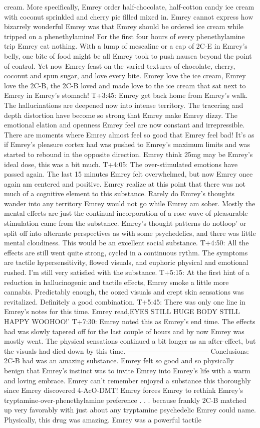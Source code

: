 \documentclass[12pt]{book}
\begin{document}
cream. More specifically, Emrey order half-chocolate, half-cotton candy ice cream with coconut sprinkled and cherry pie filled mixed in. Emrey cannot express how bizarrely wonderful Emrey was that Emrey should be ordered ice cream while tripped on a phenethylamine! For the first four hours of every phenethylamine trip Emrey eat nothing. With a lump of mescaline or a cap of 2C-E in Emrey's belly, one bite of food might be all Emrey took to push nausea beyond the point of control. Yet now Emrey feast on the varied textures of chocolate, cherry, coconut and spun sugar, and love every bite. Emrey love the ice cream, Emrey love the 2C-B, the 2C-B loved and made love to the ice cream that sat next to Emrey in Emrey's stomach! T+3:45: Emrey get back home from Emrey's walk. The hallucinations are deepened now into intense territory. The tracering and depth distortion have become so strong that Emrey make Emrey dizzy. The emotional elation and openness Emrey feel are now constant and irrepressible. There are moments where Emrey almost feel so good that Emrey feel bad! It's as if Emrey's pleasure cortex had was pushed to Emrey's maximum limits and was started to rebound in the opposite direction. Emrey think 25mg may be Emrey's ideal dose, this was a bit much. T+4:05: The over-stimulated emotions have passed again. The last 15 minutes Emrey felt overwhelmed, but now Emrey once again am centered and positive. Emrey realize at this point that there was not much of a cognitive element to this substance. Rarely do Emrey's thoughts wander into any territory Emrey would not go while Emrey am sober. Mostly the mental effects are just the continual incorporation of a rose wave of pleasurable stimulation came from the substance. Emrey's thought patterns do notloop' or split off into alternate perspectives as with some psychedelics, and there was little mental cloudiness. This would be an excellent social substance. T+4:50: All the effects are still went quite strong, cycled in a continuous rythm. The symptoms are tactile hypersensitivity, flowed visuals, and euphoric physical and emotional rushed. I'm still very satisfied with the substance. T+5:15: At the first hint of a reduction in hallucinogenic and tactile effects, Emrey smoke a little more cannabis. Predictably enough, the oozed visuals and crept skin sensations was revitalized. Definitely a good combination. T+5:45: There was only one line in Emrey's notes for this time. Emrey read,EYES STILL HUGE BODY STILL HAPPY WOOHOO!' T+7:30: Emrey noted this as Emrey's end time. The effects had was slowly tapered off for the last couple of hours and by now Emrey was mostly went. The physical sensations continued a bit longer as an after-effect, but the visuals had died down by this time. ----------------------------------- Conclusions: 2C-B had was an amazing substance. Emrey felt so good and so physically benign that Emrey's instinct was to invite Emrey into Emrey's life with a warm and loving embrace. Emrey can't remember enjoyed a substance this thoroughly since Emrey discovered 4-AcO-DMT! Emrey forces Emrey to rethink Emrey's tryptamine-over-phenethylamine preference . . .  because frankly 2C-B matched up very favorably with just about any tryptamine psychedelic Emrey could name. Physically, this drug was amazing. Emrey was a powerful tactile 
\end{document}
